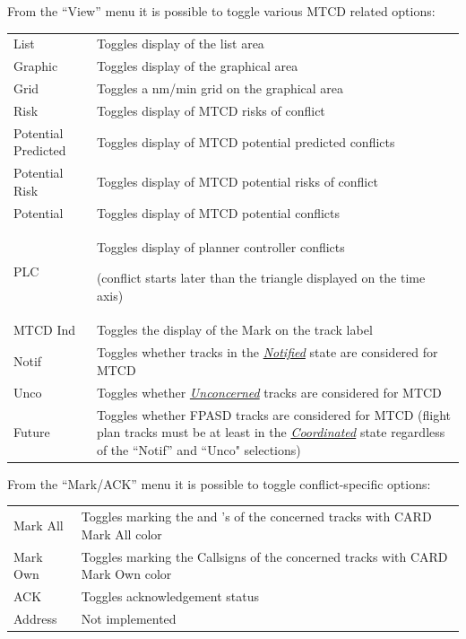 \documentclass[a4paper,oneside,11pt]{memoir}
\newcommand{\colorref}[1]{\colorbox{Flight Highlight}{\color{#1}#1}}
\newcommand{\tagref}[1]{\textit{\hyperref[#1]{\StrDel{#1}{tag:}}}}
\newcommand{\stateref}[1]{\textit{\hyperref[state:#1]{#1}}}
\begin{document}
\bigskip

From the “View” menu it is possible to toggle various MTCD related options:

\bigskip

\begin{longtable}{p{5.5cm} p{7cm}}
    List                & Toggles display of the list area\\
    Graphic             & Toggles display of the graphical area\\
    Grid                & Toggles a nm/min grid on the graphical area\\
    Risk                & Toggles display of MTCD risks of conflict\\
    Potential Predicted & Toggles display of MTCD potential predicted conflicts \\
    Potential Risk      & Toggles display of MTCD potential risks of conflict \\
    Potential           & Toggles display of MTCD potential conflicts \\
    PLC                 & Toggles display of planner controller conflicts
    
                          (conflict starts later than the triangle displayed on the time axis)\\
    MTCD Ind            & Toggles the display of the \tagref{tag:MTCD} Mark on the track label\\
    Notif               & Toggles whether tracks in the \stateref{Notified} state are considered for MTCD\\
    Unco                & Toggles whether \stateref{Unconcerned} tracks are considered for MTCD\\
    Future              & Toggles whether FPASD tracks are considered for MTCD (flight plan tracks must be at least in the \stateref{Coordinated} state regardless of the “Notif” and “Unco" selections)\\
\end{longtable}

\bigskip

From the “Mark/ACK” menu it is possible to toggle conflict-specific options:

\bigskip

\begin{longtable}{p{2.5cm} p{10cm}}
    Mark All    & Toggles marking the \tagref{tag:CALLSIGN} and \tagref{tag:AFL}’s of the concerned tracks with \colorref{CARD Mark All} color\\
    Mark Own    & Toggles marking the Callsigns of the concerned tracks with \colorref{CARD Mark Own} color\\
    ACK         & Toggles acknowledgement status\\
    Address     & Not implemented\\
\end{longtable}
\end{document}
